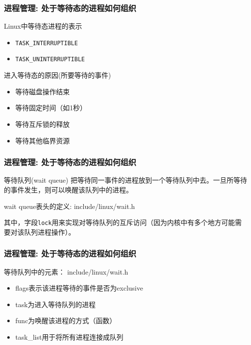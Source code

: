 \documentclass[xcolor=svgnames]{beamer}
\begin{document}
\begin{CJK*}{UTF8}{gbsn}
\begin{frame}[fragile]
\frametitle{进程管理: 处于等待态的进程如何组织}
\begin{block}{Linux中等待态进程的表示}
\begin{itemize}
\item \verb|TASK_INTERRUPTIBLE|
\item \verb|TASK_UNINTERRUPTIBLE|
\end{itemize}
\end{block}
\begin{block}{进入等待态的原因(所要等待的事件)}
\begin{itemize}
\item 等待磁盘操作结束
\item 等待固定时间（如1秒）
\item 等待互斥锁的释放
\item 等待其他临界资源
\end{itemize}
\end{block}
\end{frame}

\begin{frame}[fragile]
\frametitle{进程管理: 处于等待态的进程如何组织}
\begin{block}{等待队列(wait queue)}
把等待同一事件的进程放到一个等待队列中去。一旦所等待的事件发生，则可以唤醒该队列中的进程。
\end{block}
\begin{block}{wait queue表头的定义: include/linux/wait.h}
\lstwaitqueuehead
\end{block}
其中，字段\verb|lock|用来实现对等待队列的互斥访问（因为内核中有多个地方可能需要对该队列进程操作）。
\end{frame}


\begin{frame}[fragile]
\frametitle{进程管理: 处于等待态的进程如何组织}
\begin{block}{等待队列中的元素： include/linux/wait.h}
\lstwaitqueue
\end{block}
\begin{itemize}
\item flags表示该进程等待的事件是否为exclusive
\item task为进入等待队列的进程
\item func为唤醒该进程的方式（函数）
\item task\_list用于将所有进程连接成队列
\end{itemize}
\end{frame}


\end{CJK*}
\end{document}
